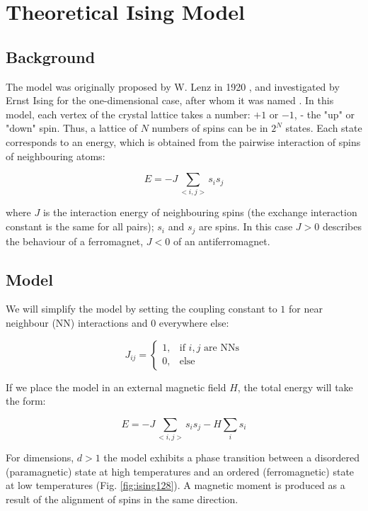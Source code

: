 \section{Theoretical Ising Model}

\subsection{Background}
The model was originally proposed by W. Lenz in 1920 \cite{lenz}, and investigated by Ernst Ising for the one-dimensional case, after whom it was named \cite{ising}. In this model, each vertex of the crystal lattice takes a number: $+1$ or $-1$, - the "up" or "down" spin. Thus, a lattice of $N$ numbers of spins can be in $2^N$ states. Each state corresponds to an energy, which is obtained from the pairwise interaction of spins of neighbouring atoms: 

\begin{equation}
\label{eq:ham}
    E = -J \sum_{<i,j>}{s_is_j}
\end{equation}

where $J$ is the interaction energy of neighbouring spins (the exchange interaction constant is the same for all pairs); $s_i$ and $s_j$ are spins. In this case $J > 0$ describes the behaviour of a ferromagnet, $J < 0$ of an antiferromagnet.

\subsection{Model}

We will simplify the model by setting the coupling constant to $1$ for near neighbour (NN) interactions and $0$ everywhere else:

\begin{equation}
	J_{ij} = \begin{cases}
			1, & \mbox{if } i,j \mbox{ are NNs}\\
			0, & \mbox{else}
		   \end{cases}
\end{equation}


If we place the model in an external magnetic field $H$, the total energy will take the form:

\begin{equation}
    E = -J \sum_{<i,j>}{s_is_j} - H \sum_{i}{s_i}
\end{equation}

For dimensions, $d > 1$ the model exhibits a phase transition between a disordered (paramagnetic) state at high temperatures and an ordered (ferromagnetic) state at low temperatures (Fig. \ref{fig:ising128}). A magnetic moment is produced as a result of the alignment of spins in the same direction. 

